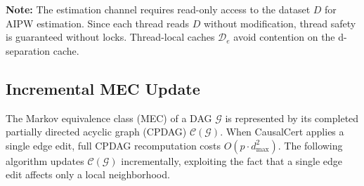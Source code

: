 \documentclass[11pt,a4paper]{article}
\theoremstyle{definition}
\theoremstyle{remark}
\newcommand{\DAG}{\mathcal{G}}
\begin{document}
\smallskip
\noindent\textbf{Note:} The estimation channel requires read-only access to the dataset
$D$ for AIPW estimation. Since each thread reads $D$ without modification, thread safety
is guaranteed without locks. Thread-local caches $\mathcal{D}_e$ avoid contention on the
d-separation cache.


\subsection{Incremental MEC Update}\label{sec:incremental_mec}

The Markov equivalence class (MEC) of a DAG $\DAG$ is represented by its completed
partially directed acyclic graph (CPDAG) $\mathcal{C}(\DAG)$. When CausalCert applies a
single edge edit, full CPDAG recomputation costs $O(p \cdot d_{\max}^2)$. The following
algorithm updates $\mathcal{C}(\DAG)$ incrementally, exploiting the fact that a single
edge edit affects only a local neighborhood.
\end{document}
